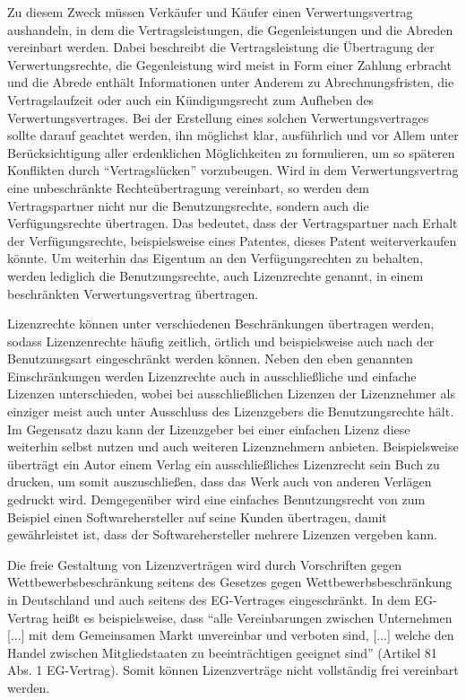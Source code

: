 Zu diesem Zweck müssen Verkäufer und Käufer einen Verwertungsvertrag aushandeln, in dem die Vertragsleistungen, die Gegenleistungen und die Abreden vereinbart werden.
Dabei beschreibt die Vertragsleistung die Übertragung der Verwertungsrechte, die Gegenleistung wird meist in Form einer Zahlung erbracht und die Abrede enthält Informationen unter Anderem
zu Abrechnungsfristen, die Vertragslaufzeit oder auch ein Kündigungsrecht zum Aufheben des Verwertungsvertrages. Bei der Erstellung eines solchen Verwertungsvertrages sollte darauf geachtet werden,
ihn möglichst klar, ausführlich und vor Allem unter Berücksichtigung aller erdenklichen Möglichkeiten zu formulieren, um so späteren Konflikten durch “Vertragslücken” vorzubeugen.
Wird in dem Verwertungsvertrag eine unbeschränkte Rechteübertragung vereinbart, so werden dem Vertragspartner nicht nur die Benutzungsrechte, sondern auch die Verfügungsrechte übertragen.
Das bedeutet, dass der Vertragspartner nach Erhalt der Verfügungsrechte, beispielsweise eines Patentes, dieses Patent weiterverkaufen könnte. Um weiterhin das Eigentum an den Verfügungsrechten
zu behalten, werden lediglich die Benutzungsrechte, auch Lizenzrechte genannt, in einem beschränkten Verwertungsvertrag übertragen. 

Lizenzrechte können unter verschiedenen Beschränkungen übertragen werden, sodass Lizenzenrechte häufig zeitlich, örtlich und beispielsweise auch nach der Benutzunsgsart eingeschränkt werden können.
Neben den eben genannten Einschränkungen werden Lizenzrechte auch in ausschließliche und einfache Lizenzen unterschieden, wobei bei ausschließlichen Lizenzen der Lizenznehmer als einziger meist
auch unter Ausschluss des Lizenzgebers die Benutzungsrechte hält. Im Gegensatz dazu kann der Lizenzgeber bei einer einfachen Lizenz diese weiterhin selbst nutzen und auch weiteren Lizenznehmern
anbieten. Beispielsweise überträgt ein Autor einem Verlag ein ausschließliches Lizenzrecht sein Buch zu drucken, um somit auszuschließen, dass das Werk auch von anderen Verlägen
gedruckt wird. Demgegenüber wird eine einfaches Benutzungsrecht von zum Beispiel einen Softwarehersteller auf seine Kunden übertragen, damit gewährleistet ist, dass der Softwarehersteller mehrere
Lizenzen vergeben kann. 

Die freie Gestaltung von Lizenzverträgen wird durch Vorschriften gegen Wettbewerbsbeschränkung seitens des Gesetzes gegen Wettbewerbsbeschränkung in Deutschland und auch seitens des EG-Vertrages
eingeschränkt. In dem EG-Vertrag heißt es beispielsweise, dass “alle Vereinbarungen zwischen Unternehmen [...] mit dem Gemeinsamen Markt unvereinbar und verboten sind, [...] welche den Handel
zwischen Mitgliedstaaten zu beeinträchtigen geeignet sind” (Artikel 81 Abs. 1 EG-Vertrag). Somit können Lizenzverträge nicht vollständig frei vereinbart werden. 
